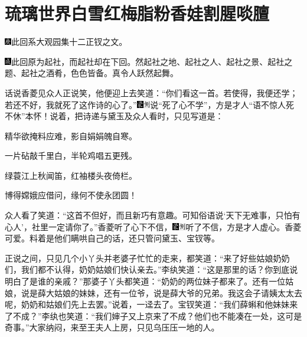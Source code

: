 

\chapter{琉璃世界白雪红梅\hspace{.5em}脂粉香娃割腥啖膻}

{\includegraphics[width=3mm]{../Images/00004}此回系大观园集十二正钗之文。}

{\includegraphics[width=3mm]{../Images/00005}此回原为起社，而起社却在下回。然起社之地、起社之人、起社之景、起社之题、起社之酒肴，色色皆备。真令人跃然起舞。}

话说香菱见众人正说笑，他便迎上去笑道：``你们看这一首。若使得，我便还学；若还不好，我就死了这作诗的心了。''{\includegraphics[width=3mm]{../Images/00006}\includegraphics[width=3mm]{../Images/00011}\footnotesize \kaishu 说``死了心不学''，方是才人``语不惊人死不休''本怀！}说着，把诗递与黛玉及众人看时，只见写道是：

精华欲掩料应难，影自娟娟魄自寒。

一片砧敲千里白，半轮鸡唱五更残。

绿蓑江上秋闻笛，红袖楼头夜倚栏。

博得嫦娥应借问，缘何不使永团圆！

众人看了笑道：``这首不但好，而且新巧有意趣。可知俗语说`天下无难事，只怕有心人'，社里一定请你了。''香菱听了心下不信，{\includegraphics[width=3mm]{../Images/00006}\includegraphics[width=3mm]{../Images/00011}\footnotesize \kaishu 听了不信，方是才人虚心。香菱可爱。}料着是他们瞒哄自己的话，还只管问黛玉、宝钗等。

正说之间，只见几个小丫头并老婆子忙忙的走来，都笑道：``来了好些姑娘奶奶们，我们都不认得，奶奶姑娘们快认亲去。''李纨笑道：``这是那里的话？你到底说明白了是谁的亲戚？''那婆子丫头都笑道：``奶奶的两位妹子都来了。还有一位姑娘，说是薛大姑娘的妹妹，还有一位爷，说是薛大爷的兄弟。我这会子请姨太太去呢，奶奶和姑娘们先上去罢。''说着，一迳去了。宝钗笑道：``我们薛蝌和他妹妹来了不成？''李纨也笑道：``我们婶子又上京来了不成？他们也不能凑在一处，这可是奇事。''大家纳闷，来至王夫人上房，只见乌压压一地的人。

